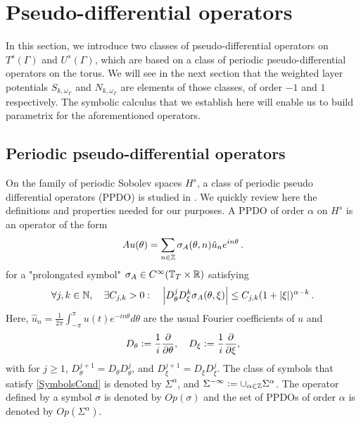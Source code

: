 \documentclass[a4paper]{article}
\begin{document}
\section{Pseudo-differential operators}


In this section, we introduce two classes of pseudo-differential operators on $T^s(\Gamma)$ and $U^s(\Gamma)$, which are based on a class of periodic pseudo-differential operators on the torus. We will see in the next section that the weighted layer potentials $S_{k,\omega_{\Gamma}}$ and $N_{k,\omega_{\Gamma}}$ are elements of those classes, of order $-1$ and $1$ respectively. The symbolic calculus that we establish here will enable us to build parametrix for the aforementioned operators. 


\subsection{Periodic pseudo-differential operators}

On the family of periodic Sobolev spaces $H^s$, a class of periodic pseudo differential operators (PPDO) is studied in \cite{thrunen1998symbol}. We quickly review here the definitions and properties needed for our purposes. A PPDO of order $\alpha$ on $H^s$ is an operator of the form 
\[Au(\theta) =  \sum_{n \in \mathbb{Z}} \sigma_A(\theta,n) \hat{u}_n e^{in\theta}\,.\]
for a "prolongated symbol" $\sigma_A \in C^{\infty}(\mathbb{T}_T \times \mathbb{R})$ satisfying 
\begin{equation}
\label{SymbolsCond}
	\forall j,k \in \mathbb{N}, \quad \exists C_{j,k} >0 : \quad \left\lvert D^j_\theta D_\xi^k \sigma_A(\theta,\xi) \right\rvert \leq C_{j,k}(1 + \left\lvert \xi \right\rvert)^{\alpha - k}\,.
\end{equation}
Here, $\hat{u}_n = \frac{1}{2\pi}\int_{-\pi}^{\pi}u(t) e^{-in\theta}d\theta$ are the usual Fourier coefficients of $u$ and 
$${D_\theta \mathrel{\mathop:}= \frac{1}{i}\frac{\partial}{\partial \theta}}, \quad  D_\xi \mathrel{\mathop:}= \frac{1}{i}\frac{\partial}{\partial \xi},$$ 
with for $j \geq 1$, $D_\theta^{j+1} = D_\theta D_\theta^j$, and $D_\xi^{j+1} = D_\xi D_\xi^j$. 
The class of symbols that satisfy \eqref{SymbolsCond} is denoted by $\Sigma^\alpha$, and $\Sigma^{-\infty} \mathrel{\mathop:}= \cup_{\alpha \in \mathbb{Z}} \Sigma^\alpha$. The operator defined by a symbol $\sigma$ is denoted by $\textit{Op}(\sigma)$ and the set of PPDOs of order $\alpha$ is denoted by $\textit{Op}(\Sigma^\alpha)$. 
\end{document}
